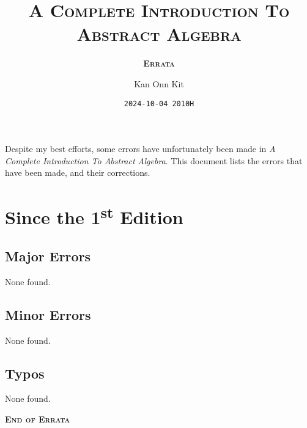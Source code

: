 \documentclass[
    a4paper,
    chapterprefix,
    DIV=9
]{scrartcl}
\title{\bfseries\scshape A Complete Introduction To\\Abstract Algebra}
\subtitle{\bfseries\scshape Errata}
\date{\texttt{2024-10-04 2010H}}
\author{Kan Onn Kit}
\begin{document}
\maketitle

Despite my best efforts, some errors have unfortunately been made in \textit{A Complete Introduction To Abstract Algebra}. This document lists the errors that have been made, and their corrections.

\section*{Since the 1\textsuperscript{st} Edition}
\subsection*{Major Errors}
None found.

\subsection*{Minor Errors}
None found.

\subsection*{Typos}
None found.

\begin{center}
    \vfill
    {\Large\bfseries\scshape End of Errata}
\end{center}
\end{document}
